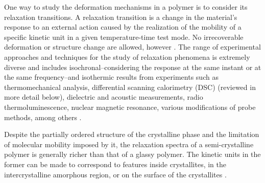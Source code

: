 One way to study the deformation mechanisms in a polymer is to consider its relaxation transitions.
A relaxation transition is a change in the material's response to an external action caused by the realization of the mobility of a specific kinetic unit in a given temperature-time test mode.
No irrecoverable deformation or structure change are allowed, however \citep{arzhakovRelaxationPhysicalMechanical2019}.
The range of experimental approaches and techniques for the study of relaxation phenomena is extremely diverse and includes isochronal--considering the response at the same instant or at the same frequency--and isothermic results from experiments such as thermomechanical analysis, differential scanning calorimetry (DSC) (reviewed in more detail below), dielectric and acoustic measurements, radio thermoluminescence, nuclear magnetic resonance, various modifications of probe methods, among others \citep{ferryViscoelasticPropertiesPolymers1980, arzhakovRelaxationPhysicalMechanical2019}.

Despite the partially ordered structure of the crystalline phase and the limitation of molecular mobility imposed by it, the relaxation spectra of a semi-crystalline polymer is generally richer than that of a glassy polymer.
The kinetic units in the former can be made to correspond to features inside crystallites, in the intercrystalline amorphous region, or on the surface of the crystallites \citep{ferryViscoelasticPropertiesPolymers1980, arzhakovRelaxationPhysicalMechanical2019}.

